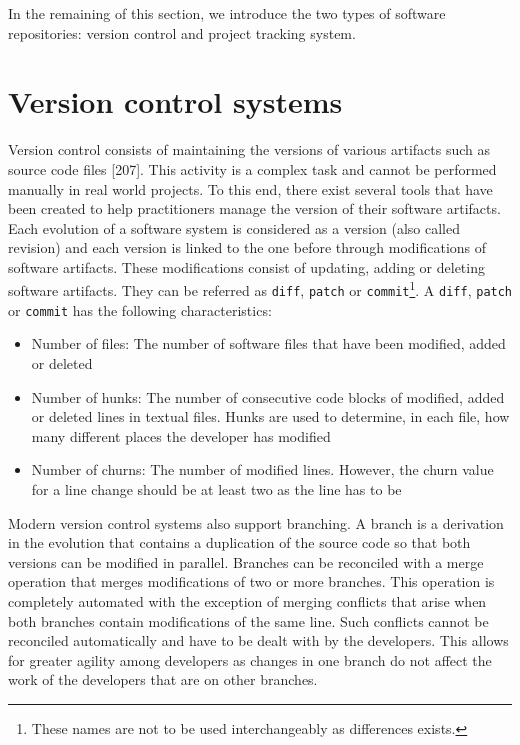 \documentclass[12pt]{report}
\providecommand{\tightlist}{%
  \setlength{\itemsep}{0pt}\setlength{\parskip}{0pt}}
\begin{document}
In the remaining of this section, we introduce the two types of software
repositories: version control and project tracking system.

\section{\texorpdfstring{Version control
systems\label{sec:version-control}}{Version control systems}}\label{version-control-systems}

Version control consists of maintaining the versions of various
artifacts such as source code files {[}207{]}. This activity is a
complex task and cannot be performed manually in real world projects. To
this end, there exist several tools that have been created to help
practitioners manage the version of their software artifacts. Each
evolution of a software system is considered as a version (also called
revision) and each version is linked to the one before through
modifications of software artifacts. These modifications consist of
updating, adding or deleting software artifacts. They can be referred as
\lstinline!diff!, \lstinline!patch! or
\lstinline!commit!\footnote{These names are not to be used interchangeably as differences exists.}.
A \lstinline!diff!, \lstinline!patch! or \lstinline!commit! has the
following characteristics:

\begin{itemize}
\tightlist
\item
  Number of files: The number of software files that have been modified,
  added or deleted
\item
  Number of hunks: The number of consecutive code blocks of modified,
  added or deleted lines in textual files. Hunks are used to determine,
  in each file, how many different places the developer has modified
\item
  Number of churns: The number of modified lines. However, the churn
  value for a line change should be at least two as the line has to be
\end{itemize}

Modern version control systems also support branching. A branch is a
derivation in the evolution that contains a duplication of the source
code so that both versions can be modified in parallel. Branches can be
reconciled with a merge operation that merges modifications of two or
more branches. This operation is completely automated with the exception
of merging conflicts that arise when both branches contain modifications
of the same line. Such conflicts cannot be reconciled automatically and
have to be dealt with by the developers. This allows for greater agility
among developers as changes in one branch do not affect the work of the
developers that are on other branches.
\end{document}
